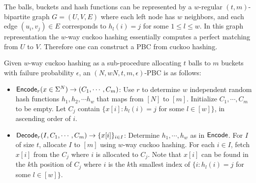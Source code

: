 The balls, buckets and hash functions can be represented by a $w$-regular $(t,m)$-bipartite graph $G=(U,V,E)$ where each left node has $w$ neighbors, and each edge $(u_i,v_j)\in E$ corresponds to $h_l(i)=j$ for some $1\le l\le w$. In this graph representation the $w$-way cuckoo hashing essentially computes a perfect matching from $U$ to $V$. Therefore one can construct a PBC from cuckoo hashing. 

\begin{construction}
  Given $w$-way cuckoo hashing as a sub-procedure allocating $t$ balls to $m$ buckets with failure probability $\epsilon$, an $(N,wN,t,m,\epsilon)$-PBC is as follows: 
  \begin{itemize}
    \item ${\sf Encode}_r(x\in\Sigma^N)\rightarrow (C_1,\cdots,C_m)$: Use $r$ to determine $w$ independent random hash functions $h_1,h_2,\cdots h_w$ that maps from $[N]$ to $[m]$. Initialize $C_1,\cdots,C_m$ to be empty. Let $C_j$ contain $\{x[i]:h_l(i) = j$ for some $l\in [w]\}$, in ascending order of $i$. 
    \item ${\sf Decode}_r(I, C_1,\cdots, C_m)\rightarrow \{x[i]\}_{i\in I}$: Determine $h_1,\cdots, h_w$ as in ${\sf Encode}$. For $I$ of size $t$, allocate $I$ to $[m]$ using $w$-way cuckoo hashing. For each $i\in I$, fetch $x[i]$ from the $C_j$ where $i$ is allocated to $C_j$. Note that $x[i]$ can be found in the $k$th position of $C_j$ where $i$ is the $k$th smallest index of $\{i:h_l(i) = j$ for some $l\in [w]\}$. 
  \end{itemize}
\end{construction}
